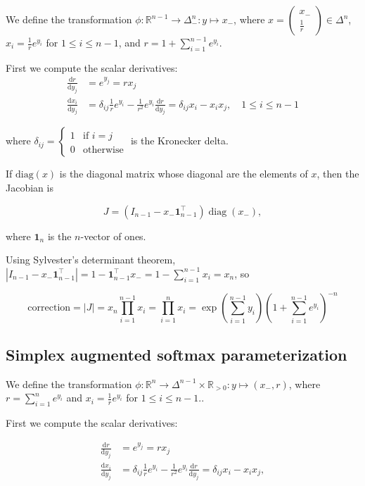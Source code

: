 \documentclass[twoside]{article}
\begin{document}
We define the transformation $\phi: \mathbb{R}^{n-1} \to \Delta^n_-: y \mapsto x_-$, where $x=\begin{pmatrix}x_- \\ \frac{1}{r}\end{pmatrix} \in \Delta^n$, $x_i = \frac{1}{r} e^{y_i}$ for $1 \le i \le n-1$, and $r = 1 + \sum_{i=1}^{n-1} e^{y_i}$.

First we compute the scalar derivatives:
$$
\begin{aligned}
    \frac{\mathrm{d} r}{\mathrm{d} y_j} &= e^{y_j} = r x_j\\
    \frac{\mathrm{d} x_i}{\mathrm{d} y_j} &= \delta_{ij} \frac{1}{r} e^{y_i} - \frac{1}{r^2} e^{y_i} \frac{\mathrm{d} r}{\mathrm{d} y_j} = \delta_{ij} x_i - x_i x_j, \quad 1 \le i \le n-1
\end{aligned}
$$

where $\delta_{ij} = \begin{cases} 1 &\text{if } i = j \\ 0 &\text{otherwise}\end{cases}$ is the Kronecker delta.

If $\mathrm{diag}(x)$ is the diagonal matrix whose diagonal are the elements of $x$, then the Jacobian is

$$J = (I_{n-1} - x_- \boldsymbol{1}_{n-1}^\top) \operatorname{diag}(x_-),$$

where $\boldsymbol{1}_n$ is the $n$-vector of ones.

Using Sylvester's determinant theorem, $|I_{n-1} - x_- \boldsymbol{1}_{n-1}^\top| = 1 - \boldsymbol{1}_{n-1}^\top x_- = 1 - \sum_{i=1}^{n-1} x_i = x_n$, so

$$\mathrm{correction} = |J| = x_n \prod_{i=1}^{n-1} x_i = \prod_{i=1}^{n} x_i = \exp\left(\sum_{i=1}^{n-1} y_i\right) \left(1 + \sum_{i=1}^{n-1} e^{y_i}\right)^{-n}$$

\subsection{Simplex augmented softmax parameterization}

We define the transformation $\phi: \mathbb{R}^n \to \Delta^{n-1} \times \mathbb{R}_{>0}: y \mapsto (x_-, r)$,
where $r = \sum_{i=1}^n e^{y_i}$ and $x_i = \frac{1}{r} e^{y_i}$ for $1 \le i \le n-1$..

First we compute the scalar derivatives:

$$
\begin{aligned}
    \frac{\mathrm{d} r}{\mathrm{d} y_j} &= e^{y_j} = r x_j\\
    \frac{\mathrm{d} x_i}{\mathrm{d} y_j} &= \delta_{ij} \frac{1}{r} e^{y_i} - \frac{1}{r^2} e^{y_i} \frac{\mathrm{d} r}{\mathrm{d} y_j} = \delta_{ij} x_i - x_i x_j,
\end{aligned}
$$
\end{document}

